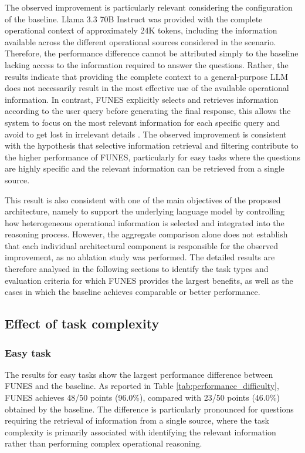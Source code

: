 The observed improvement is particularly relevant considering the configuration of the baseline. Llama 3.3 70B Instruct was provided with the complete operational context of approximately 24K tokens, including the information available across the different operational sources considered in the scenario. Therefore, the performance difference cannot be attributed simply to the baseline lacking access to the information required to answer the questions. Rather, the results indicate that providing the complete context to a general-purpose LLM does not necessarily result in the most effective use of the available operational information. In contrast, FUNES explicitly selects and retrieves information according to the user query before generating the final response, this allows the system to focus on the most relevant information for each specific query and avoid to get lost in irrelevant details \cite{liu-etal-2024-lost}. The observed improvement is consistent with the hypothesis that selective information retrieval and filtering contribute to the higher performance of FUNES, particularly for easy tasks where the questions are highly specific and the relevant information can be retrieved from a single source.

This result is also consistent with one of the main objectives of the proposed architecture, namely to support the underlying language model by controlling how heterogeneous operational information is selected and integrated into the reasoning process. However, the aggregate comparison alone does not establish that each individual architectural component is responsible for the observed improvement, as no ablation study was performed. The detailed results are therefore analysed in the following sections to identify the task types and evaluation criteria for which FUNES provides the largest benefits, as well as the cases in which the baseline achieves comparable or better performance.



\subsection{Effect of task complexity}

\subsubsection{Easy task}

The results for easy tasks show the largest performance difference between FUNES and the baseline. As reported in Table \ref{tab:performance_difficulty}, FUNES achieves 48/50 points (96.0\%), compared with 23/50 points (46.0\%) obtained by the baseline. The difference is particularly pronounced for questions requiring the retrieval of information from a single source, where the task complexity is primarily associated with identifying the relevant information rather than performing complex operational reasoning.

